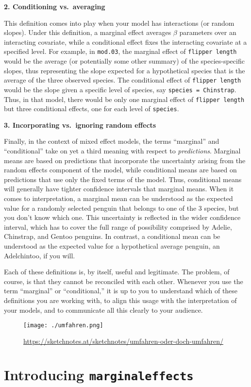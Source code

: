 \documentclass[
]{article}
\begin{document}
\textbf{2. Conditioning vs.~averaging}

This definition comes into play when your model has interactions (or
random slopes). Under this definition, a marginal effect averages
\(\beta\) parameters over an interacting covariate, while a conditional
effect fixes the interacting covariate at a specified level. For
example, in \texttt{mod.03}, the marginal effect of
\texttt{flipper\ length} would be the average (or potentially some other
summary) of the species-specific slopes, thus representing the slope
expected for a hypothetical species that is the average of the three
observed species. The conditional effect of \texttt{flipper\ length}
would be the slope given a specific level of species, say
\texttt{species\ =\ Chinstrap}. Thus, in that model, there would be only
one marginal effect of \texttt{flipper\ length} but three conditional
effects, one for each level of \texttt{species}.

\textbf{3. Incorporating vs.~ignoring random effects}

Finally, in the context of mixed effect models, the terms ``marginal''
and ``conditional'' take on yet a third meaning with respect to
\emph{predictions}. Marginal means are based on predictions that
incorporate the uncertainty arising from the random effects component of
the model, while conditional means are based on predictions that use
only the fixed terms of the model. Thus, conditional means will
generally have tighter confidence intervals that marginal means. When it
comes to interpretation, a marginal mean can be understood as the
expected value for a randomly selected penguin that belongs to one of
the 3 species, but you don't know which one. This uncertainty is
reflected in the wider confidence interval, which has to cover the full
range of possibility comprised by Adelie, Chinstrap, and Gentoo
penguins. In contrast, a conditional mean can be understood as the
expected value for a hypothetical average penguin, an Adelchintoo, if
you will.

Each of these definitions is, by itself, useful and legitimate. The
problem, of course, is that they cannot be reconciled with each other.
Whenever you use the term ``marginal'' or ``conditional,'' it is up to
you to understand which of these definitions you are working with, to
align this usage with the interpretation of your models, and to
communicate all this clearly to your audience.

\begin{figure}
\centering
\texttt{[image: ./umfahren.png]}
\caption{\url{https://sketchnotes.at/sketchnotes/umfahren-oder-doch-umfahren/}}
\end{figure}

\hypertarget{introducing-marginaleffects}{%
\section{\texorpdfstring{Introducing
\texttt{marginaleffects}}{Introducing marginaleffects}}\label{introducing-marginaleffects}}
\end{document}
